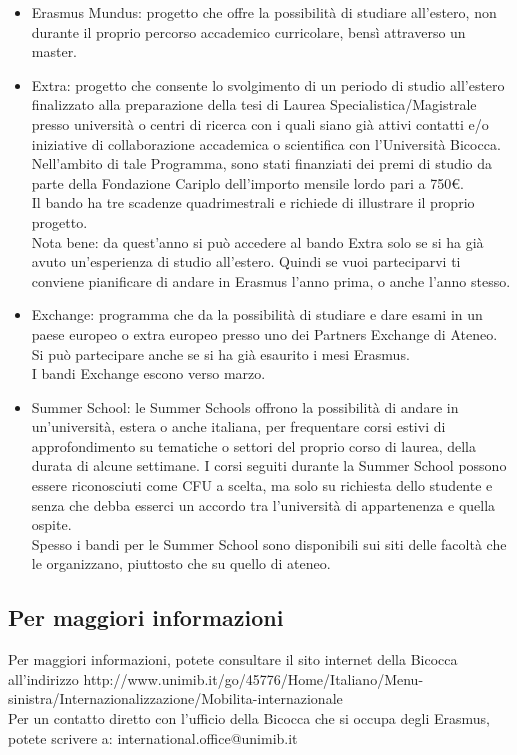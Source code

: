\begin{itemize}
\item Erasmus Mundus: progetto che offre la possibilità di studiare all'estero, non durante il proprio percorso accademico curricolare, bensì attraverso un master. 

\item Extra: progetto che consente lo svolgimento di un periodo di studio all'estero finalizzato alla preparazione della tesi di Laurea Specialistica/Magistrale presso università o centri di ricerca con i quali siano già attivi contatti e/o iniziative di collaborazione accademica o scientifica con l'Università Bicocca. Nell'ambito di tale Programma, sono stati finanziati dei premi di studio da parte della Fondazione Cariplo dell'importo mensile lordo pari a 750€.\\
Il bando ha tre scadenze quadrimestrali e richiede di illustrare il proprio progetto.\\
Nota bene: da quest'anno si può accedere al bando Extra solo se si ha già avuto un'esperienza di studio all'estero. Quindi se vuoi parteciparvi ti conviene pianificare di andare in Erasmus l'anno prima, o anche l'anno stesso.

\item Exchange: programma che da la possibilità di studiare e dare esami in un paese europeo o extra europeo presso uno dei Partners Exchange di Ateneo. Si può partecipare anche se si ha già esaurito i mesi Erasmus.\\
I bandi Exchange escono verso marzo.

\item Summer School: le Summer Schools offrono la possibilità di andare in un'università, estera o anche italiana, per frequentare corsi estivi di approfondimento su tematiche o settori del proprio corso di laurea, della durata di alcune settimane. I corsi seguiti durante la Summer School possono essere riconosciuti come CFU a scelta, ma solo su richiesta dello studente e senza che debba esserci un accordo tra l'università di appartenenza e quella ospite.\\
Spesso i bandi per le Summer School sono disponibili sui siti delle facoltà che le organizzano, piuttosto che su quello di ateneo.
\end{itemize}


\subsection{Per maggiori informazioni}
Per maggiori informazioni, potete consultare il sito internet della Bicocca all'indirizzo http://www.unimib.it/go/45776/Home/Italiano/Menu-sinistra/Internazionalizzazione/Mobilita-internazionale \\
Per un contatto diretto con l'ufficio della Bicocca che si occupa degli Erasmus, potete scrivere a: international.office@unimib.it
